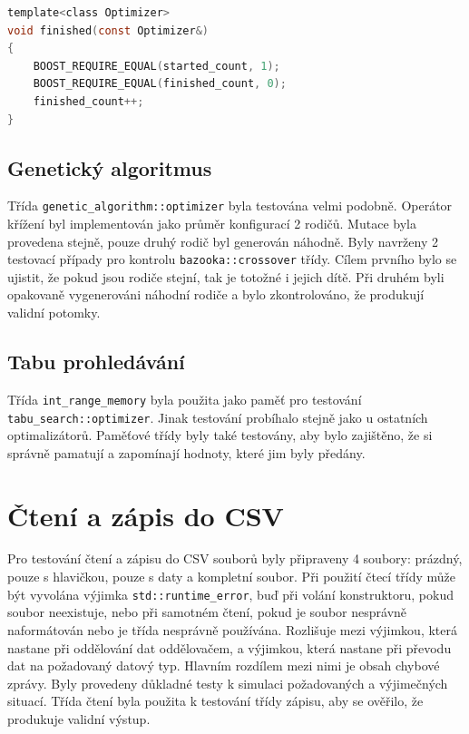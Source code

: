 \begin{lstlisting}[caption={~Kontrola hodnot čítače uvnitř metody \texttt{finished}},label={lst:event:counter:finished},captionpos=t,abovecaptionskip=-\medskipamount,belowcaptionskip=\medskipamount,language=C]
template<class Optimizer>
void finished(const Optimizer&)
{
    BOOST_REQUIRE_EQUAL(started_count, 1);
    BOOST_REQUIRE_EQUAL(finished_count, 0);
    finished_count++;
}
\end{lstlisting}

\subsection{Genetický algoritmus}
Třída \texttt{genetic\_algorithm::optimizer} byla testována velmi podobně.
Operátor křížení byl implementován jako průměr konfigurací 2 rodičů.
Mutace byla provedena stejně, pouze druhý rodič byl generován náhodně.
Byly navrženy 2 testovací případy pro kontrolu \texttt{bazooka::crossover} třídy.
Cílem prvního bylo se ujistit, že pokud jsou rodiče stejní, tak je totožné i jejich dítě.
Při druhém byli opakovaně vygenerováni náhodní rodiče a bylo zkontrolováno, že produkují validní potomky.

\subsection{Tabu prohledávání}
Třída \texttt{int\_range\_memory} byla použita jako paměť pro testování \texttt{tabu\_search::optimizer}.
Jinak testování probíhalo stejně jako u ostatních optimalizátorů.
Paměťové třídy byly také testovány, aby bylo zajištěno, že si správně pamatují a zapomínají hodnoty, které jim byly předány.

\section{Čtení a zápis do CSV}
Pro testování čtení a zápisu do CSV souborů byly připraveny 4 soubory: prázdný, pouze s hlavičkou, pouze s daty a kompletní soubor.
Při použití čtecí třídy může být vyvolána výjimka \texttt{std::runtime\_error}, buď při volání konstruktoru, pokud soubor neexistuje, nebo při samotném čtení, pokud je soubor nesprávně naformátován nebo je třída nesprávně používána.
Rozlišuje mezi výjimkou, která nastane při oddělování dat oddělovačem, a výjimkou, která nastane při převodu dat na požadovaný datový typ.
Hlavním rozdílem mezi nimi je obsah chybové zprávy.
Byly provedeny důkladné testy k simulaci požadovaných a výjimečných situací.
Třída čtení byla použita k testování třídy zápisu, aby se ověřilo, že produkuje validní výstup.

